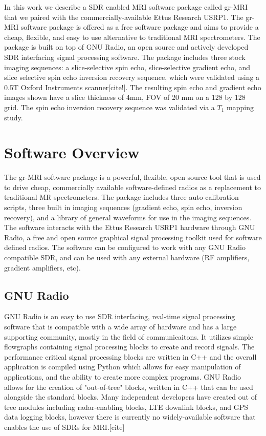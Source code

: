 \documentclass[review]{elsarticle}
\begin{document}
In this work we describe a SDR enabled MRI software package called gr-MRI that we paired with the commercially-available Ettus Research USRP1.  The gr-MRI software package is offered as a free software package and aims to provide a cheap, flexible, and easy to use alternative to traditional MRI spectrometers.  The package is built on top of GNU Radio, an open source and actively developed SDR interfacing signal processing software.  The package includes three stock imaging sequences: a slice-selective spin echo, slice-selective gradient echo, and slice selective spin echo inversion recovery sequence, which were validated using a 0.5T Oxford Instruments scanner[cite!].  The resulting spin echo and gradient echo images shown have a slice thickness of 4mm, FOV of 20 mm on a 128 by 128 grid.  The spin echo inversion recovery sequence was validated via a $T_1$ mapping study.
 
\section{Software Overview}\label{Software Overview}
\indent The gr-MRI software package is a powerful, flexible, open source tool that is used to drive cheap, commercially available software-defined radios as a replacement to traditional MR spectrometers.  The package includes three auto-calibration scripts, three built in imaging sequences (gradient echo, spin echo, inversion recovery), and a library of general waveforms for use in the imaging sequences.  The software interacts with the Ettus Research USRP1 hardware through GNU Radio, a free and open source graphical signal processing toolkit used for software defined radios.  The software can be configured to work with any GNU Radio compatible SDR, and can be used with any external hardware (RF amplifiers, gradient amplifiers, etc).

\subsection{GNU Radio}\label{GNU Radio}

\indent GNU Radio is an easy to use SDR interfacing, real-time signal processing software that is compatible with a wide array of hardware and has a large supporting community, mostly in the field of communicaitons.  It utilizes simple flowgraphs containing signal processing blocks to create and record signals.  The performance critical signal processing blocks are written in C++ and the overall application is compiled using Python which allows for easy manipulation of applications, and the ability to create more complex programs.  GNU Radio allows for the creation of "out-of-tree" blocks, written in C++ that can be used alongside the standard blocks.  Many independent developers have created out of tree modules including radar-enabling blocks, LTE downlink blocks, and GPS data logging blocks, however there is currently no widely-available software that enables the use of SDRs for MRI.[cite]
\end{document}
